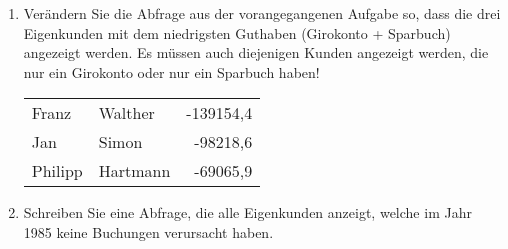 \begin{enumerate}
\begin{center}
\begin{small}
\begin{msoraclesql}
\begin{supertabular}{llr}
              \end{supertabular}
            \end{msoraclesql}
          \end{small}
        \end{center}
        \item Ver\"andern Sie die Abfrage aus der vorangegangenen Aufgabe so,
        dass die drei Eigenkunden mit dem niedrigsten Guthaben (Girokonto +
        Sparbuch) angezeigt werden. Es m\"ussen auch diejenigen Kunden angezeigt
        werden, die nur ein Girokonto oder nur ein Sparbuch haben!
        \begin{center}
          \begin{small}
            \tablehead{}
            \begin{msoraclesql}
              \begin{supertabular}{llr}
                Franz & Walther & -139154,4 \\
                Jan & Simon & -98218,6 \\
                Philipp & Hartmann & -69065,9 \\
              \end{supertabular}
            \end{msoraclesql}
          \end{small}
        \end{center}
        \item Schreiben Sie eine Abfrage, die alle Eigenkunden anzeigt, welche
        im Jahr 1985 keine Buchungen verursacht haben.
        \begin{center}
          \begin{small}
\end{small}
\end{center}
\end{enumerate}
